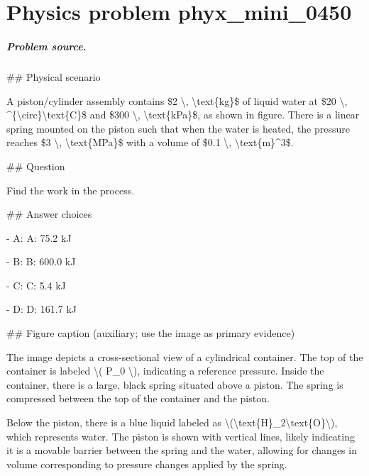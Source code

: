 
\chapter{Physics problem phyx\_mini\_0450}
\label{ch:PhyXMiniProblems_problem_phyx_mini_0450}

\paragraph{Problem source.}
\#\# Physical scenario

A piston/cylinder assembly contains \$2 \textbackslash{}, \textbackslash{}text\{kg\}\$ of liquid water at \$20 \textbackslash{}, \textasciicircum{}\{\textbackslash{}circ\}\textbackslash{}text\{C\}\$ and \$300 \textbackslash{}, \textbackslash{}text\{kPa\}\$, as shown in figure. There is a linear spring mounted on the piston such that when the water is heated, the pressure reaches \$3 \textbackslash{}, \textbackslash{}text\{MPa\}\$ with a volume of \$0.1 \textbackslash{}, \textbackslash{}text\{m\}\textasciicircum{}3\$.

\#\# Question

Find the work in the process.

\#\# Answer choices

- A: A: 75.2 kJ

- B: B: 600.0 kJ

- C: C: 5.4 kJ

- D: D: 161.7 kJ

\#\# Figure caption (auxiliary; use the image as primary evidence)

The image depicts a cross-sectional view of a cylindrical container. The top of the container is labeled \textbackslash{}( P\_0 \textbackslash{}), indicating a reference pressure. Inside the container, there is a large, black spring situated above a piston. The spring is compressed between the top of the container and the piston.

Below the piston, there is a blue liquid labeled as \textbackslash{}(\textbackslash{}text\{H\}\_2\textbackslash{}text\{O\}\textbackslash{}), which represents water. The piston is shown with vertical lines, likely indicating it is a movable barrier between the spring and the water, allowing for changes in volume corresponding to pressure changes applied by the spring.

